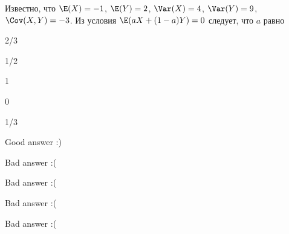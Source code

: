 
\begin{question}
Известно, что \(\E(X)=-1\), \(\E(Y)=2\), \(\Var(X)=4\), \(\Var(Y)=9\),
\(\Cov(X,Y)=-3\). Из условия \(\E(aX+(1-a)Y)=0\) следует, что \(a\)
равно
\begin{answerlist}
  \item 2/3
  \item 1/2
  \item 1
  \item 0
  \item 1/3
\end{answerlist}
\end{question}

\begin{solution}
\begin{answerlist}
  \item Good answer :)
  \item Bad answer :(
  \item Bad answer :(
  \item Bad answer :(
  \item Bad answer :(
\end{answerlist}
\end{solution}

